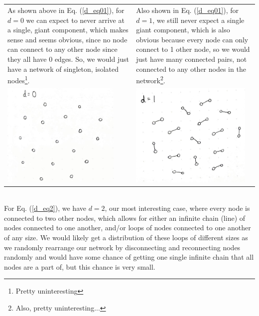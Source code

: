 \documentclass[11pt, oneside]{article}   	%
\newcommand{\prob}[2]{
\indent \\
\noindent{\color{green!50!blue}\bf {\large#1}}
{\normalfont #2}
}
\begin{document}
	\indent \prob{c)}{\\
	\hspace{-3mm} \begin{tabular}{p{8cm}p{8cm}}
		As shown above in Eq. (\ref{d_eq01}), for $d = 0$ we can expect to never arrive at a single, giant component, which makes sense and seems obvious, since no node can connect to any other node since they all have 0 edges. So, we would just have a network of singleton, isolated nodes\footnote{Pretty uninteresting}.
		&
		Also shown in Eq. (\ref{d_eq01}), for $d = 1$, we still never expect a single giant component, which is also obvious because every node can only connect to 1 other node, so we would just have many connected pairs, not connected to any other nodes in the network\footnote{Also, pretty uninteresting...}.
		\\
		\centering\includegraphics[height=5cm]{figs/degree_0-reg-net}
		&
		\centering\includegraphics[height=5cm]{figs/degree_1-reg-net}
	\end{tabular}\\
	For Eq. (\ref{d_eq2}), we have $d=2$, our most interesting case, where every node is connected to two other nodes, which allows for either an infinite chain (line) of nodes connected to one another, and/or loops of nodes connected to one another of any size. We would likely get a distribution of these loops of different sizes as we randomly rearrange our network by disconnecting and reconnecting nodes randomly and would have some chance of getting one single infinite chain that all nodes are a part of, but this chance is very small.
}
\end{document}
